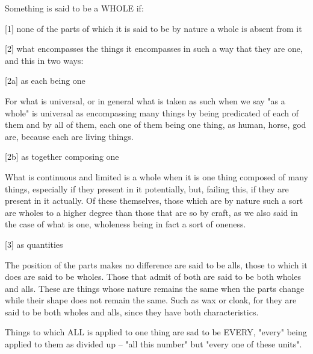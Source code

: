 
Something is said to be a WHOLE if:

[1]     none of the parts of which it is said to be by nature a whole
        is absent from it

[2]     what encompasses the things it encompasses in such a way 
        that they are one, and this in two ways:

[2a]    as each being one

        For what is universal, or in general what is taken as such 
        when we say "as a whole" is universal as encompassing
        many things by being predicated of each of them and by all of them,
        each one of them being one thing, as human, horse, god are,
        because each are living things.
        
[2b]    as together composing one

        What is continuous and limited is a whole when it is one thing
        composed of many things, especially if they present in it potentially,
        but, failing this, if they are present in it actually.
        Of these themselves, those which are by nature such a sort are
        wholes to a higher degree than those that are so by craft,
        as we also said in the case of what is one,
        wholeness being in fact a sort of oneness.

[3]     as quantities

        The position of the parts makes no difference are said to be alls,
        those to which it does are said to be wholes. Those that admit of both
        are said to be both wholes and alls. These are things whose nature remains
        the same when the parts change while their shape does not remain the same.
        Such as wax or cloak, for they are said to be both wholes and alls,
        since they have both characteristics.


Things to which ALL is applied to one thing are sad to be EVERY,
"every" being applied to them as divided up -- "all this number" but
"every one of these units".
